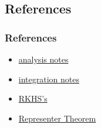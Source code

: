 \documentclass[notheorems]{beamer}
\theoremstyle{definition}
\begin{document}
\begin{frame}
\section{References}
\frametitle{References}

\begin{itemize}
\item \href{https://github.com/carsonaj/Mathematics/blob/master/Introduction\%20to\%20Analysis/Introduction\%20to\%20Analysis.pdf}{analysis notes}

\item \href{https://github.com/carsonaj/Mathematics/blob/master/Introduction\%20to\%20Measure\%20and\%20Integration/Introduction\%20to\%20Measure\%20and\%20Integration.pdf}{integration notes}

\item \href{https://en.wikipedia.org/wiki/Reproducing_kernel_Hilbert_space}{RKHS's}

\item \href{https://en.wikipedia.org/wiki/Representer_theorem}{Representer Theorem}
\end{itemize}




\end{frame}
\end{document}
